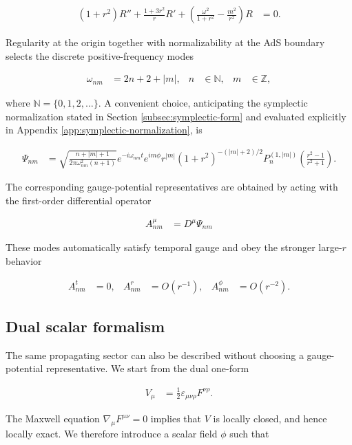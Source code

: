 \begin{align}
(1+r^{2})R''+\frac{1+3r^{2}}{r}R'+\left(\frac{\omega^{2}}{1+r^{2}}-\frac{m^{2}}{r^{2}}\right)R&=0.
\end{align}

Regularity at the origin together with normalizability at the AdS boundary selects the discrete positive-frequency modes

\begin{align}
\omega_{nm}&=2n+2+|m|, &
n&\in\mathbb{N}, &
m&\in\mathbb{Z},
\end{align}

where $\mathbb{N}=\{0,1,2,\ldots\}$. A convenient choice, anticipating the symplectic normalization stated in Section \ref{subsec:symplectic-form} and evaluated explicitly in Appendix \ref{app:symplectic-normalization}, is

\begin{align}
\Psi_{nm}&=\sqrt{\frac{n+|m|+1}{2\pi\omega_{nm}^{2}(n+1)}}e^{-i\omega_{nm}t}e^{im\phi}r^{|m|}(1+r^{2})^{-(|m|+2)/2}P_{n}^{(1,|m|)}\left(\frac{r^{2}-1}{r^{2}+1}\right).
\end{align}

The corresponding gauge-potential representatives are obtained by acting with the first-order differential operator

\begin{align}
A_{nm}^{\mu}&=D^{\mu}\Psi_{nm}
\end{align}

These modes automatically satisfy temporal gauge and obey the stronger large-$r$ behavior

\begin{align}
A^{t}_{nm}&=0, &
A^{r}_{nm}&=O(r^{-1}), &
A^{\phi}_{nm}&=O(r^{-2}).
\end{align}

\subsection{Dual scalar formalism}\label{subsec:dual-scalar-field-strength}

The same propagating sector can also be described without choosing a gauge-potential representative. We start from the dual one-form

\begin{align}
V_{\mu}&=\frac{1}{2}\varepsilon_{\mu\nu\rho}F^{\nu\rho}.
\end{align}

The Maxwell equation $\nabla_{\mu}F^{\mu\nu}=0$ implies that $V$ is locally closed, and hence locally exact. We therefore introduce a scalar field $\phi$ such that

